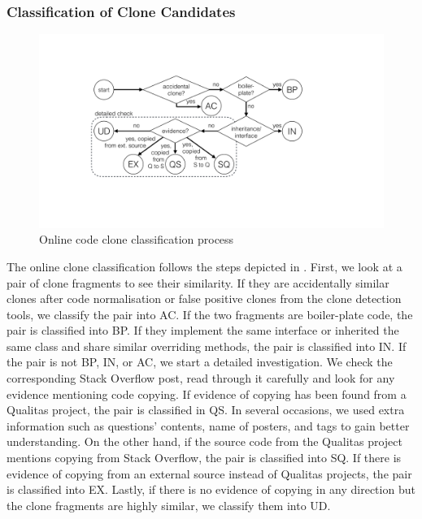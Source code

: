 \documentclass[sigconf,review, anonymous]{acmart}
\begin{document}

\subsubsection{Classification of Clone Candidates}

\begin{figure}
	\centering
	\includegraphics[width=\linewidth]{classification_process}
	\caption{Online code clone classification process}
	\label{fig:classification_process}
\end{figure}

The online clone classification follows the steps depicted in . First, we look at a pair of clone fragments to see their similarity. If they are accidentally similar clones after code normalisation or false positive clones from the clone detection tools, we classify the pair into AC. If the two fragments are boiler-plate code, the pair is classified into BP. If they implement the same interface or inherited the same class and share similar overriding methods, the pair is classified into IN. If the pair is not BP, IN, or AC, we start a detailed investigation. We check the corresponding Stack Overflow post, read through it carefully and look for any evidence mentioning code copying. If evidence of copying has been found from a Qualitas project, the pair is classified in QS. In several occasions, we used extra information such as questions' contents, name of posters, and tags to gain better understanding. On the other hand, if the source code from the Qualitas project mentions copying from Stack Overflow, the pair is classified into SQ. If there is evidence of copying from an external source instead of Qualitas projects, the pair is classified into EX. Lastly, if there is no evidence of copying in any direction but the clone fragments are highly similar, we classify them into UD.
\end{document}
